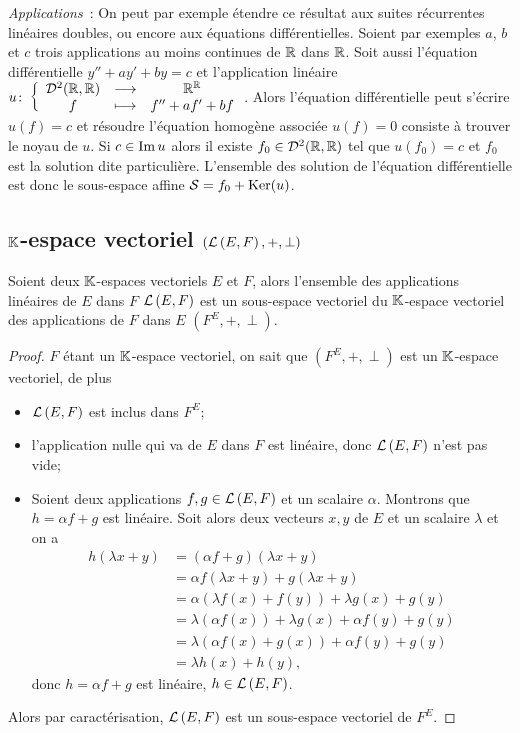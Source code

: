 \emph{Applications}~: On peut par exemple étendre ce résultat aux suites
récurrentes linéaires doubles, ou encore aux équations différentielles. Soient
par exemples \(a\), \(b\) et \(c\) trois applications au moins continues de
\(\mathbb{R}\) dans \(\mathbb{R}\). Soit aussi l'équation différentielle \(y''+ay'+by=c\) et
l'application linéaire \(u\colon\left\{\begin{array}{ccc}\mathcal{D}^{2}(\mathbb{R},\mathbb{R}) & \longrightarrow &\mathbb{R}^{\mathbb{R}}\\f & \longmapsto & f''+af'+bf\end{array}\right.\).
Alors l'équation différentielle peut s'écrire \(u(f)=c\) et résoudre l'équation
homogène associée \(u(f)=0\) consiste à trouver le noyau de \(u\). Si \(c \in
\operatorname{Im}{u}\) alors il existe \(f_0 \in \mathcal{D}^{2}(\mathbb{R},\mathbb{R})\) tel que \(u(f_0)=c\) et
\(f_0\) est la solution dite particulière. L'ensemble des solution de l'équation
différentielle est donc le sous-espace affine \(\mathcal{S}=f_0 + \operatorname{Ker}(u)\).

\subsection{\(\mathbb{K}\)-espace vectoriel \((\mathcal{L}\left(E,F\right), +, \perp)\)}

\begin{theo}
  Soient deux \(\mathbb{K}\)-espaces vectoriels \(E\) et \(F\), alors l'ensemble des
  applications linéaires de \(E\) dans \(F\) \(\mathcal{L}\left(E,F\right)\) est un sous-espace
  vectoriel du \(\mathbb{K}\)-espace vectoriel des applications de \(F\) dans \(E\)
  \((F^E,+,\perp)\).
\end{theo}

\begin{proof}
  \(F\) étant un \(\mathbb{K}\)-espace vectoriel, on sait que \((F^E,+,\perp)\) est un
  \(\mathbb{K}\)-espace vectoriel, de plus
  \begin{itemize}
    \item \(\mathcal{L}\left(E,F\right)\) est inclus dans \(F^E\);
    \item l'application nulle qui va de \(E\) dans \(F\) est linéaire, donc
      \(\mathcal{L}\left(E,F\right)\) n'est pas vide;
    \item Soient deux applications \(f,g \in \mathcal{L}\left(E,F\right)\) et un scalaire
      \(\alpha\). Montrons que \(h=\alpha f +g\) est linéaire. Soit alors deux
      vecteurs \(x,y\) de \(E\) et un scalaire \(\lambda\) et on a
      \begin{align}
        h(\lambda x+y)&=(\alpha f+g)(\lambda x+y) \\
        &=\alpha f(\lambda x+y)  +g(\lambda x+y) \\
        &=\alpha(\lambda f(x)+f(y)) +\lambda g(x)+g(y) \\
        &=\lambda(\alpha f(x)) + \lambda g(x) + \alpha f(y) +g(y)\\
        &=\lambda(\alpha f(x)+g(x))+\alpha f(y) +g(y) \\
        &=\lambda h(x)+h(y),
      \end{align}
      donc \(h=\alpha f+g\) est linéaire, \(h \in \mathcal{L}\left(E,F\right)\).
  \end{itemize}
  Alors par caractérisation, \(\mathcal{L}\left(E,F\right)\) est un sous-espace vectoriel de
  \(F^E\).
\end{proof}

